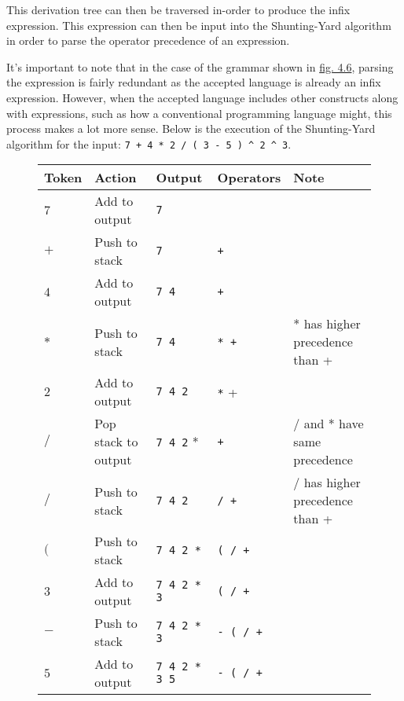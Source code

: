 \documentclass[12pt, letterpaper]{article}
\theoremstyle{definition}
\begin{document}
This derivation tree can then be traversed in-order to produce the infix expression. This expression can then be input into the Shunting-Yard algorithm in order to parse the operator precedence of an expression.

It's important to note that in the case of the grammar shown in \hyperref[fig:4.6]{fig. 4.6}, parsing the expression is fairly redundant as the accepted language is already an infix expression. However, when the accepted language includes other constructs along with expressions, such as how a conventional programming language might, this process makes a lot more sense. Below is the execution of the Shunting-Yard algorithm for the input: \verb|7 + 4 * 2 / ( 3 - 5 ) ^ 2 ^ 3|.\textsuperscript{\cite{shunting-yard}}

\begin{figure}[H]
    \begin{center}
        \begin{tabular}{| m{1.2cm} | m{3.1cm} | m{3.6cm} | m{2.3cm} | m{3.5cm} |}
            \hline
            \textbf{Token} & \textbf{Action} & \textbf{Output} & \textbf{Operators} & \textbf{Note}\\
            \hline
            $7$ & Add to output & \verb|7| & &\\
            \hline
            $+$ & Push to stack & \verb|7| & \verb|+| &\\
            \hline
            $4$ & Add to output & \verb|7 4| & \verb|+| &\\
            \hline
            $*$ & Push to stack & \verb|7 4| & \verb|* +| & * has higher precedence than +\\
            \hline
            $2$ & Add to output & \verb|7 4 2| & \verb|*| + &\\
            \hline
            $/$ & Pop stack to output & \verb|7 4 2| * & \verb|+| & / and * have same precedence\\
            \hline
            $/$ & Push to stack & \verb|7 4 2| & \verb|/ +| & / has higher precedence than +\\
            \hline
            $($ & Push to stack & \verb|7 4 2 *| & \verb|( / +| &\\
            \hline
            $3$ & Add to output & \verb|7 4 2 * 3| & \verb|( / +| &\\
            \hline
            $-$ & Push to stack & \verb|7 4 2 * 3| & \verb|- ( / +| &\\
            \hline
            $5$ & Add to output & \verb|7 4 2 * 3 5| & \verb|- ( / +| &\\

\end{tabular}
\end{center}
\end{figure}
\end{document}

